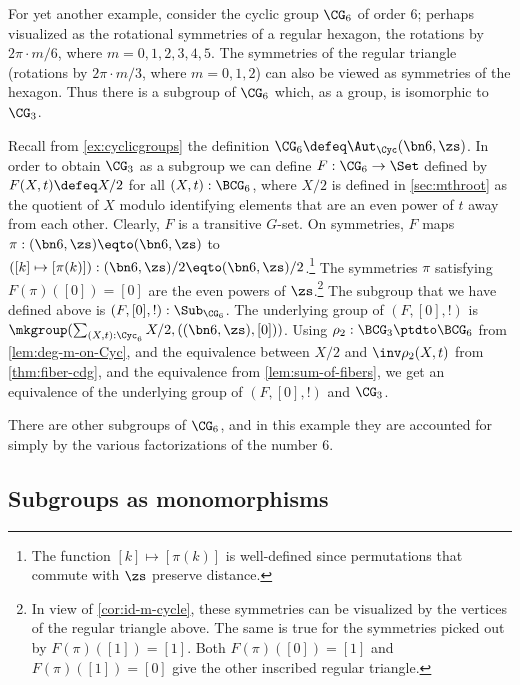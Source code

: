 For yet another example, consider the cyclic group $\CG_6$ of order $6$; perhaps visualized as the rotational symmetries of a regular hexagon,  \ie the rotations by $2\pi\cdot m /6$, where $m=0,1,2,3,4,5$.
The symmetries of the regular triangle (rotations by $2\pi\cdot m/3$, where $m=0,1,2$) can also be viewed as symmetries of the hexagon.
Thus there is a subgroup of $\CG_6$ which, as a group, is isomorphic to $\CG_3$.

\begin{example}
  \label{exa:C3subC6}%
Recall from \cref{ex:cyclicgroups} the definition 
$\CG_6\defeq\Aut_\Cyc(\bn6,\zs)$.
In order to obtain $\CG_3$ as a subgroup we can define
$F : \CG_6 \to \Set$ defined by $F(X,t) \defeq X/2$ for all $(X,t):\BCG_6$,
where $X/2$ is defined in \cref{sec:mthroot} as the quotient of $X$
modulo identifying elements that are an even power of $t$ away from each other.
Clearly, $F$ is a transitive $G$-set.
On symmetries, $F$ maps $\pi : (\bn6,\zs) \eqto (\bn6,\zs)$ to 
$([k] \mapsto [\pi(k)]) : (\bn6,\zs)/2 \eqto (\bn6,\zs)/2$.\footnote{%
The function $[k] \mapsto [\pi(k)]$ is well-defined since
permutations that commute with $\zs$ preserve distance.}
The symmetries $\pi$ satisfying $F(\pi)([0])=[0]$ are the
even powers of $\zs$.\footnote{%
In view of \cref{cor:id-m-cycle}, these symmetries can be visualized 
by the vertices of the regular triangle above.
The same is true for the symmetries picked out by $F(\pi)([1])=[1]$.
Both $F(\pi)([0])=[1]$ and $F(\pi)([1])=[0]$ give the other inscribed
regular triangle.} 
The subgroup that we have defined above is $(F,[0],!) : \Sub_{\CG_6}$.
The underlying group of $(F,[0],!)$ is 
$\mkgroup(\sum_{(X,t):\Cyc_6} X/2, ((\bn6,\zs),[0]))$.
Using $\rho_2: \BCG_3 \ptdto \BCG_6$ from \cref{lem:deg-m-on-Cyc},
and the equivalence between $X/2$ and $\inv\rho_2 (X,t)$ from
\cref{thm:fiber-cdg}, and the equivalence from \cref{lem:sum-of-fibers},
we get an equivalence of the underlying group of  $(F,[0],!)$ and $\CG_3$.
\end{example}

There are other subgroups of $\CG_6$, and in this example they are accounted for simply by the various factorizations of the number $6$.

\subsection{Subgroups as monomorphisms}

